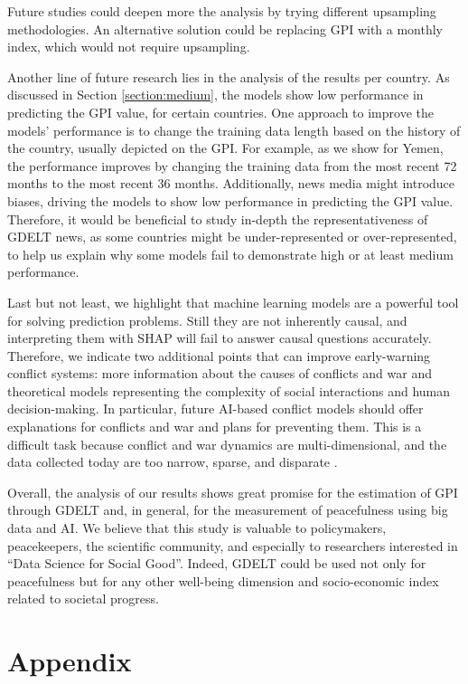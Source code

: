 \documentclass{bmcart}
\begin{document}
Future studies could deepen more the analysis by trying different upsampling methodologies. 
An alternative solution could be replacing GPI with a monthly index, which would not require upsampling. 

Another line of future research lies in the analysis of the results per country. As discussed in Section \ref{section:medium}, the models show low performance in predicting the GPI value, for certain countries. One approach to improve the models' performance is to change the training data length based on the history of the country, usually depicted on the GPI. 
For example, as we show for Yemen, the performance improves by changing the training data from the most recent 72 months to the most recent 36 months. 
Additionally, news media might introduce biases, driving the models to show low performance in predicting the GPI value. Therefore, it would be beneficial to study in-depth the representativeness of GDELT news, as some countries might be under-represented or over-represented, to help us explain why some models fail to demonstrate high or at least medium performance.

Last but not least, we highlight that machine learning models are a powerful tool for solving prediction problems. Still they are not inherently causal, and interpreting them with SHAP will fail to answer causal questions accurately.
Therefore, we indicate two additional points that can improve early-warning conflict systems: more information about the causes of conflicts and war and theoretical models representing the complexity of social interactions and human decision-making. 
In particular, future AI-based conflict models should offer explanations for conflicts and war and plans for preventing them. This is a difficult task because conflict and war dynamics are multi-dimensional, and the data collected today are too narrow, sparse, and disparate \cite{guo2018retool}.

Overall, the analysis of our results shows great promise for the estimation of GPI through GDELT and, in general, for the measurement of peacefulness using big data and AI. 
We believe that this study is valuable to policymakers, peacekeepers, the scientific community, and especially to researchers interested in ``Data Science for Social Good''. Indeed, GDELT could be used not only for peacefulness but for any other well-being dimension and socio-economic index related to societal progress.

\section*{Appendix}
\label{appendix}
\end{document}
